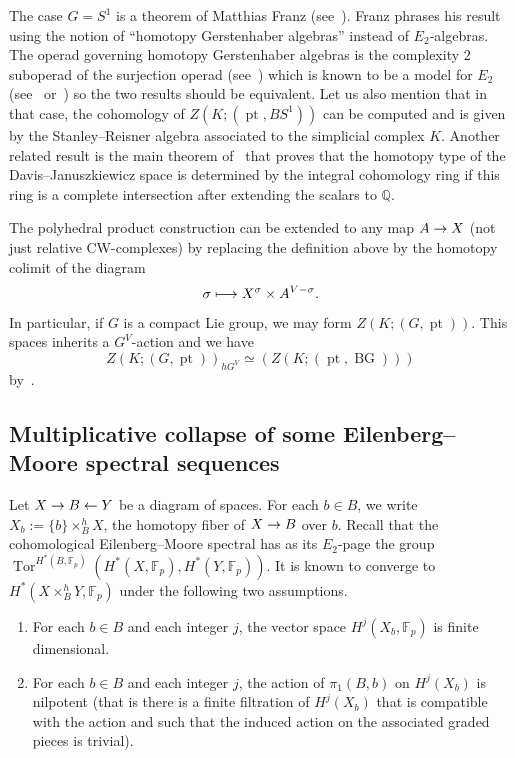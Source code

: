 \documentclass[AHL,Unicode,longabstracts,published]{cedram}
\DeclareMathOperator{\BG}{BG}
\DeclareMathOperator{\ppt}{pt}
\DeclareMathOperator{\rTor}{Tor}
\newcommand{\FF}{\mathbb{F}}
\newcommand{\bbQ}{\mathbb{Q}}
\renewcommand*{\to}{\mathchoice{\longrightarrow}{\rightarrow}{\rightarrow}{\rightarrow}}
\let\oldmapsto\mapsto
\renewcommand*{\mapsto}{\mathchoice{\longmapsto}{\oldmapsto}{\oldmapsto}{\oldmapsto}}
\newcommand{\FF}{\mathbb{F}}
\begin{document}
\begin{rema}
The case $G=S^1$ is a theorem of Matthias Franz (see~\cite{franzhomotopy}). Franz phrases his result using the notion of ``homotopy Gerstenhaber algebras'' instead of $E_2$-algebras. The operad governing homotopy Gerstenhaber algebras is the complexity $2$ suboperad of the surjection operad (see~\cite[Subsection~3.1]{franzhomotopygerst}) which is known to be a model for $E_2$ (see~\cite[Section~4]{mccluresmith} or~\cite[Subsection~1.6]{bergerfresse}) so the two results should be equivalent. Let us also mention that in that case, the cohomology of $Z(K;(\ppt,BS^1))$ can be computed and is given by the Stanley--Reisner algebra associated to the simplicial complex $K$. Another related result is the main theorem of~\cite{notbohmrayII} that proves that the homotopy type of the Davis--Januszkiewicz space is determined by the integral cohomology ring if this ring is a complete intersection after extending the scalars to $\bbQ$.
\end{rema}

\begin{rema}
The polyhedral product construction can be extended to any map $A\to X$ (not just relative CW-complexes) by replacing the definition above by the homotopy colimit of the diagram
\[
\sigma\mapsto X^{\sigma}\times A^{V-\sigma}.
\]
In particular, if $G$ is a compact Lie group, we may form $Z(K;(G,\ppt))$. This spaces inherits a $G^V$-action and we have
\[
Z(K;(G,\ppt))_{hG^V}\simeq (Z(K;(\ppt,\BG)))
\]
by~\cite[Lemma~2.3.2]{denhamsuciu}.
\end{rema}


\subsection{Multiplicative collapse of some Eilenberg--Moore spectral sequences}

Let $X\to B\leftarrow Y$ be a diagram of spaces. For each $b\in B$, we write $X_b:=\{b\}\times^h_BX$, the homotopy fiber of $X\to B$ over $b$. Recall that the cohomological Eilenberg--Moore spectral has as its $E_2$-page the group $\rTor^{H^*(B,\FF_p)}(H^*(X,\FF_p),H^*(Y,\FF_p))$. It is known to converge to $H^*(X\times_B^hY,\FF_p)$ under the following two assumptions.
\begin{enumerate}
\item For each $b\in B$ and each integer $j$, the vector space $H^j(X_b,\FF_p)$ is finite dimensional.
\item For each $b\in B$ and each integer $j$, the action of $\pi_1(B,b)$ on $H^j(X_b)$ is nilpotent (that is there is a finite filtration of $H^j(X_b)$ that is compatible with the action and such that the induced action on the associated graded pieces is trivial).
\end{enumerate}
\end{document}
